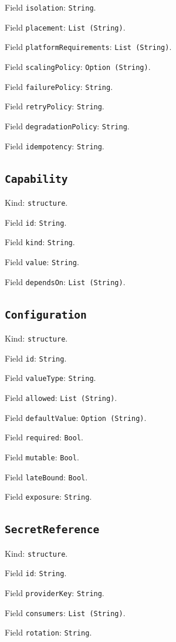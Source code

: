 \documentclass[11pt]{article}
\begin{document}
\noindent Field \texttt{isolation}: \texttt{String}.\par
\noindent Field \texttt{placement}: \texttt{List (String)}.\par
\noindent Field \texttt{platformRequirements}: \texttt{List (String)}.\par
\noindent Field \texttt{scalingPolicy}: \texttt{Option (String)}.\par
\noindent Field \texttt{failurePolicy}: \texttt{String}.\par
\noindent Field \texttt{retryPolicy}: \texttt{String}.\par
\noindent Field \texttt{degradationPolicy}: \texttt{String}.\par
\noindent Field \texttt{idempotency}: \texttt{String}.\par
\subsection*{\texttt{Capability}}
\noindent Kind: \texttt{structure}.\par
\noindent Field \texttt{id}: \texttt{String}.\par
\noindent Field \texttt{kind}: \texttt{String}.\par
\noindent Field \texttt{value}: \texttt{String}.\par
\noindent Field \texttt{dependsOn}: \texttt{List (String)}.\par
\subsection*{\texttt{Configuration}}
\noindent Kind: \texttt{structure}.\par
\noindent Field \texttt{id}: \texttt{String}.\par
\noindent Field \texttt{valueType}: \texttt{String}.\par
\noindent Field \texttt{allowed}: \texttt{List (String)}.\par
\noindent Field \texttt{defaultValue}: \texttt{Option (String)}.\par
\noindent Field \texttt{required}: \texttt{Bool}.\par
\noindent Field \texttt{mutable}: \texttt{Bool}.\par
\noindent Field \texttt{lateBound}: \texttt{Bool}.\par
\noindent Field \texttt{exposure}: \texttt{String}.\par
\subsection*{\texttt{SecretReference}}
\noindent Kind: \texttt{structure}.\par
\noindent Field \texttt{id}: \texttt{String}.\par
\noindent Field \texttt{providerKey}: \texttt{String}.\par
\noindent Field \texttt{consumers}: \texttt{List (String)}.\par
\noindent Field \texttt{rotation}: \texttt{String}.\par
\end{document}

